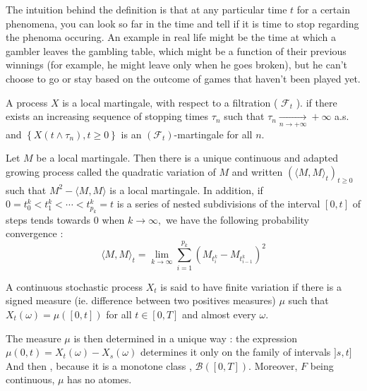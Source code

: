 	The intuition behind the definition is that at any particular time $t$ for a certain phenomena, you can look so far in the time and tell if it is time to stop regarding the phenoma occuring.
	An example in real life might be the time at which a gambler leaves the gambling table, which might be a function of their previous winnings (for example, he might leave only when he goes broken), but he can't choose to go or stay based on the outcome of games that haven't been played yet.


	\begin{definition}

		A process $X$ is a local martingale, with respect to a filtration ( $\mathcal{F}_{t}$ ). if there exists an increasing sequence of stopping times $\tau_{n}$ such that $\tau_{n} \underset{n \rightarrow+\infty}{\longrightarrow}+\infty$
		a.s. and $\left\{X\left(t \wedge \tau_{n}\right), t \geq 0\right\}$ is an
		$\left(\mathcal{F}_{t}\right)$-martingale for all $n$.

	\end{definition}
	\begin{theorem}
		Let $M$ be a local martingale. Then there is a unique continuous and adapted growing process called the quadratic variation of $M$ and written $\left(\langle M, M\rangle_{t}\right)_{t \geq 0}$ such that $M^{2}-\langle M, M\rangle$ is a local martingale. In addition, if $0=t_{0}^{k}<t_{1}^{k}<\cdots<t_{p_{k}}^{k}=t$
		is a series of nested subdivisions of the interval $[0, t]$ of steps tends towards 0 when $k \rightarrow \infty,$ we have the following probability convergence :
		\[ \langle M, M\rangle_{t}=\lim _{k \rightarrow \infty} \sum_{i=1}^{p_{k}}\left(M_{t_{i}^{k}}-M_{t_{i-1}^{k}}\right)^{2} \]
	\end{theorem}


	\begin{definition}
		A continuous stochastic process $X_t$ is said to have finite variation if there is a signed measure (ie. difference between two positives measures) $\mu$ such that $X_t(\omega)=\mu([0, t])$ for all $t \in[0, T]$ and almost every $\omega$.
	\end{definition}

	The measure $\mu$ is then determined in a unique way : the expression $\mu(0, t)=X_t(\omega)-X_s(\omega)$ determines it only on the family of intervals $]s, t]$ And then , because it is a monotone class , $\mathcal{B}([0, T]) .$ Moreover, $F$ being continuous, $\mu$ has no atomes.

